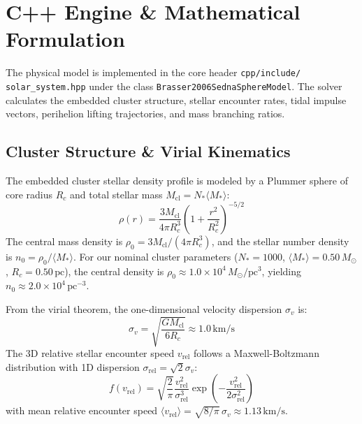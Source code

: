 \documentclass[11pt,a4paper]{article}
\begin{document}
\section{C++ Engine \& Mathematical Formulation}
The physical model is implemented in the core header \texttt{cpp/include/} \texttt{solar\_system.hpp} under the class \texttt{Brasser2006SednaSphereModel}. The solver calculates the embedded cluster structure, stellar encounter rates, tidal impulse vectors, perihelion lifting trajectories, and mass branching ratios.

\subsection{Cluster Structure \& Virial Kinematics}
The embedded cluster stellar density profile is modeled by a Plummer sphere of core radius $R_c$ and total stellar mass $M_{\text{cl}} = N_* \langle M_* \rangle$:
\begin{equation}
\rho(r) = \frac{3 M_{\text{cl}}}{4 \pi R_c^3} \left( 1 + \frac{r^2}{R_c^2} \right)^{-5/2}
\label{eq:plummer}
\end{equation}
The central mass density is $\rho_0 = 3 M_{\text{cl}} / (4 \pi R_c^3)$, and the stellar number density is $n_0 = \rho_0 / \langle M_* \rangle$. For our nominal cluster parameters ($N_* = 1000$, $\langle M_* \rangle = 0.50\,M_\odot$, $R_c = 0.50\,\text{pc}$), the central density is $\rho_0 \approx 1.0 \times 10^4\,M_\odot/\text{pc}^3$, yielding $n_0 \approx 2.0 \times 10^4\,\text{pc}^{-3}$.

From the virial theorem, the one-dimensional velocity dispersion $\sigma_v$ is:
\begin{equation}
\sigma_v = \sqrt{\frac{G M_{\text{cl}}}{6 R_c}} \approx 1.0\,\text{km/s}
\label{eq:sigma_v}
\end{equation}
The 3D relative stellar encounter speed $v_{\text{rel}}$ follows a Maxwell-Boltzmann distribution with 1D dispersion $\sigma_{\text{rel}} = \sqrt{2}\sigma_v$:
\begin{equation}
f(v_{\text{rel}}) = \sqrt{\frac{2}{\pi}} \frac{v_{\text{rel}}^2}{\sigma_{\text{rel}}^3} \exp\left( -\frac{v_{\text{rel}}^2}{2 \sigma_{\text{rel}}^2} \right)
\label{eq:maxwell}
\end{equation}
with mean relative encounter speed $\langle v_{\text{rel}} \rangle = \sqrt{8/\pi}\,\sigma_v \approx 1.13\,\text{km/s}$.
\end{document}
